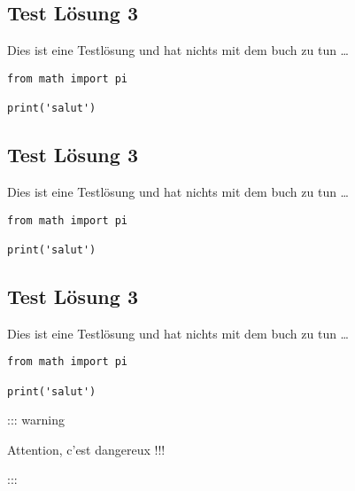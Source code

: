 \subsection{Test Lösung 3}\label{test-luxf6sung-3-2}

Dies ist eine Testlösung und hat nichts mit dem buch zu tun \ldots{}

\begin{verbatim}
from math import pi

print('salut')
\end{verbatim}

\subsection{Test Lösung 3}\label{test-luxf6sung-3-3}

Dies ist eine Testlösung und hat nichts mit dem buch zu tun \ldots{}

\begin{verbatim}
from math import pi

print('salut')
\end{verbatim}

\subsection{Test Lösung 3}\label{test-luxf6sung-3-4}

Dies ist eine Testlösung und hat nichts mit dem buch zu tun \ldots{}

\begin{verbatim}
from math import pi

print('salut')
\end{verbatim}

::: warning

Attention, c'est dangereux !!!

:::
